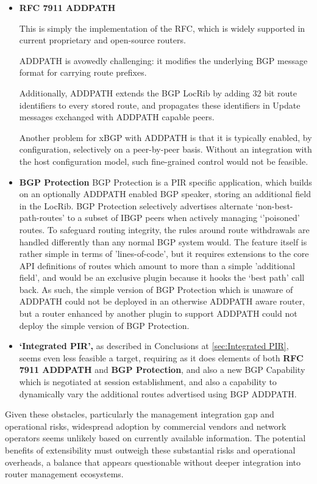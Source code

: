 \begin{itemize}
    \item\textbf{RFC 7911 ADDPATH}

    This is simply the implementation of the RFC, which is widely supported in current proprietary and open-source routers.
    
    ADDPATH is avowedly challenging: it modifies the underlying BGP message format for carrying route prefixes.

    Additionally, ADDPATH extends the BGP LocRib by adding 32 bit route identifiers to every stored route, and propagates these identifiers in Update messages exchanged with ADDPATH capable peers.

    Another problem for xBGP with ADDPATH is that it is typically enabled,  by configuration, selectively on a peer-by-peer basis.  Without an integration with the host configuration model, such fine-grained control would not be feasible.
    
    \item  \textbf{BGP Protection}  BGP Protection is a PIR specific application, which builds on an optionally ADDPATH enabled BGP speaker, storing an additional field in the LocRib.  BGP Protection selectively advertises alternate `non-best-path-routes' to a subset of IBGP peers when actively managing `'poisoned' routes.  To safeguard routing integrity, the rules around route withdrawals are handled differently than any normal BGP system would.  The feature itself is rather simple in terms of 'lines-of-code', but it requires extensions to the core API definitions of routes which amount to more than a simple 'additional field', and would be an exclusive plugin because it hooks the `best path' call back.  As such, the simple version of BGP Protection which is unaware of ADDPATH could not be deployed in an otherwise ADDPATH aware router, but a router enhanced by another plugin to support ADDPATH could not deploy the simple version of BGP Protection.
    \item  \textbf{`Integrated PIR', } as described in Conclusions at \ref{sec:Integrated PIR}, seems even less feasible a target, requiring as it does elements of both \textbf{RFC 7911 ADDPATH} and  \textbf{BGP Protection}, and also a new BGP Capability which is negotiated at session establishment, and also a capability to dynamically vary the additional routes advertised using BGP ADDPATH.
\end{itemize}

Given these obstacles, particularly the management integration gap and operational risks, widespread adoption by commercial vendors and network operators seems unlikely based on currently available information. The potential benefits of extensibility must outweigh these substantial risks and operational overheads, a balance that appears questionable without deeper integration into router management ecosystems.

